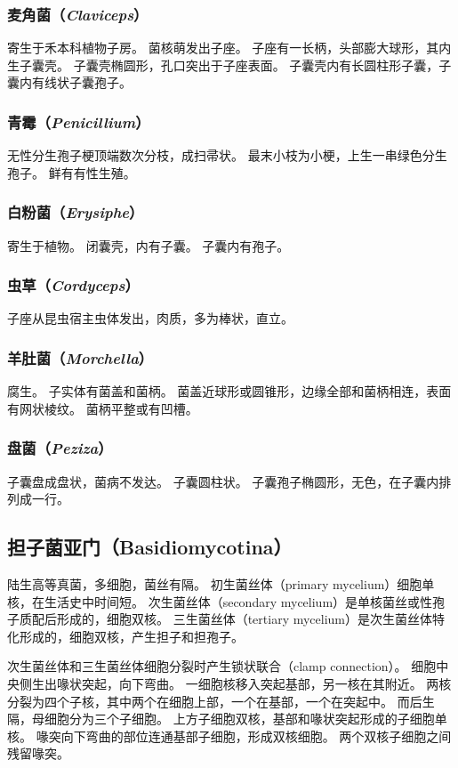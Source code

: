 \documentclass[11pt]{article}
\begin{document}
\subsubsection{麦角菌（\textit{Claviceps}）}
寄生于禾本科植物子房。
菌核萌发出子座。
子座有一长柄，头部膨大球形，其内生子囊壳。
子囊壳椭圆形，孔口突出于子座表面。
子囊壳内有长圆柱形子囊，子囊内有线状子囊孢子。

\subsubsection{青霉（\textit{Penicillium}）}
无性分生孢子梗顶端数次分枝，成扫帚状。
最末小枝为小梗，上生一串绿色分生孢子。
鲜有有性生殖。

\subsubsection{白粉菌（\textit{Erysiphe}）}
寄生于植物。
闭囊壳，内有子囊。
子囊内有孢子。

\subsubsection{虫草（\textit{Cordyceps}）}
子座从昆虫宿主虫体发出，肉质，多为棒状，直立。

\subsubsection{羊肚菌（\textit{Morchella}）}
腐生。
子实体有菌盖和菌柄。
菌盖近球形或圆锥形，边缘全部和菌柄相连，表面有网状棱纹。
菌柄平整或有凹槽。

\subsubsection{盘菌（\textit{Peziza}）}
子囊盘成盘状，菌病不发达。
子囊圆柱状。
子囊孢子椭圆形，无色，在子囊内排列成一行。

\subsection{担子菌亚门（Basidiomycotina）}
陆生高等真菌，多细胞，菌丝有隔。
初生菌丝体（primary mycelium）细胞单核，在生活史中时间短。
次生菌丝体（secondary mycelium）是单核菌丝或性孢子质配后形成的，细胞双核。
三生菌丝体（tertiary mycelium）是次生菌丝体特化形成的，细胞双核，产生担子和担孢子。

\newline

次生菌丝体和三生菌丝体细胞分裂时产生锁状联合（clamp connection）。
细胞中央侧生出喙状突起，向下弯曲。
一细胞核移入突起基部，另一核在其附近。
两核分裂为四个子核，其中两个在细胞上部，一个在基部，一个在突起中。
而后生隔，母细胞分为三个子细胞。
上方子细胞双核，基部和喙状突起形成的子细胞单核。
喙突向下弯曲的部位连通基部子细胞，形成双核细胞。
两个双核子细胞之间残留喙突。
\end{document}
